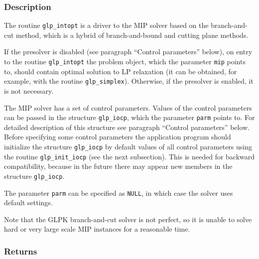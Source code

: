 \subsubsection*{Description}

The routine \verb|glp_intopt| is a driver to the MIP solver based on
the branch-and-cut method, which is a hybrid of branch-and-bound and
cutting plane methods.

If the presolver is disabled (see paragraph ``Control parameters''
below), on entry to the routine \verb|glp_intopt| the problem object,
which the parameter \verb|mip| points to, should contain optimal
solution to LP relaxation (it can be obtained, for example, with the
routine \verb|glp_simplex|). Otherwise, if the presolver is enabled, it
is not necessary.

The MIP solver has a set of control parameters. Values of the control
parameters can be passed in the structure \verb|glp_iocp|, which the
parameter \verb|parm| points to. For detailed description of this
structure see paragraph ``Control parameters'' below. Before specifying
some control parameters the application program should initialize the
structure \verb|glp_iocp| by default values of all control parameters
using the routine \verb|glp_init_iocp| (see the next subsection). This
is needed for backward compatibility, because in the future there may
appear new members in the structure \verb|glp_iocp|.

The parameter \verb|parm| can be specified as \verb|NULL|, in which case
the solver uses default settings.

Note that the GLPK branch-and-cut solver is not perfect, so it is unable
to solve hard or very large scale MIP instances for a reasonable time.

\subsubsection*{Returns}

\def\arraystretch{1}


